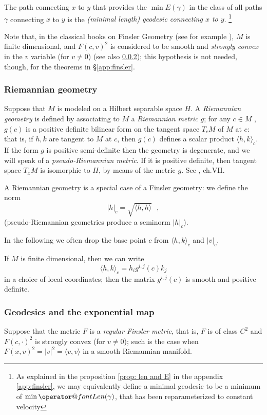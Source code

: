 \documentclass[twoside,a4paper,english]{article}
\makeatletter
\def\Len{\mathop{\operator@font Len}\nolimits}
\makeatother
\begin{document}
  
The path connecting $x$ to $y$  that provides the $\min {E(\gamma)}$
in the class of all paths $\gamma$ connecting $x$ to $y$
is the \emph{(minimal length) geodesic connecting $x$ to $y$}.%
\footnote{As explained in the proposition \ref{prop: len and E} in
  the appendix \ref{app:finsler}, 
  we may equivalently define a minimal geodesic to be a minimum of
  $\min {\Len(\gamma)}$, that has been reparameterized to constant velocity}




Note that, in the classical books on Finsler Geometry
(see for example \cite{BaoChernShen}),
$M$ is finite dimensional, and $F(c,v)^2$ is considered to be
smooth and \emph{strongly convex} in the $v$ variable (for $v\neq 0$)
(see also \ref{sec: Geodesics and the exponential map});
this hypothesis is not needed,
though, for the  theorems in \S\ref{app:finsler}.

\subsubsection{Riemannian geometry}


\begin{Definition}
  Suppose that $M$ is %
  modeled on a Hilbert separable space $H$.
  A \emph{Riemannian geometry} is defined by 
  associating to $M$ a
  \emph{Riemannian metric} $g$;  for any $c\in M$ , $g(c)$ is a
  positive definite
  bilinear form on the tangent space $T_cM$ of $M$ at $c$: that is, if
  $h,k$ are tangent to $M$ at $c$, then $g(c)$ defines
  a scalar product $\langle h,  k\rangle_c$.
  If the form $g$ is positive semi-definite then the
  geometry is degenerate, 
  and we will speak of a \emph{pseudo-Riemannian metric}.
  If it is positive definite, then
  tangent space $T_xM$ is isomorphic to $H$, by
  means of the metric $g$.
  See \cite{Lang:FDG}, ch.VII.
\end{Definition}
A Riemannian geometry is a special case of a Finsler geometry:
we define the norm \[|h|_c=\sqrt{\langle h, h\rangle}~~~,\]
(pseudo-Riemannian geometries produce a seminorm $|h|_c$).

In the following we often drop the base point $c$ from
$\langle h, k\rangle_c$ and $|v|_c$.

\smallskip

If $M$ is finite dimensional,  then we can write 
$$\langle h, k\rangle_c= h_i g^{i,j}(c) k_j$$
in a choice of local coordinates;
then the matrix $g^{i,j}(c)$ is smooth and positive definite.

\subsubsection{Geodesics and the exponential map}
\label{sec: Geodesics and the exponential map}
Suppose that the metric $F$ is a \emph{regular Finsler metric}, that is,
$F$ is of class $C^2$ and $F(c,\cdot)^2$ is
strongly convex (for $v\neq 0$);
such is the case when $F(x,v)^2=|v|^2=\langle v,v\rangle$ in
a smooth Riemannian manifold.
\end{document}
